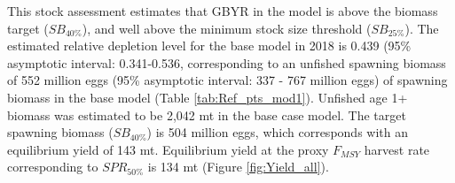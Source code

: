 \documentclass[12pt,]{article}
\begin{document}
This stock assessment estimates that GBYR in the model is above the
biomass target (\(SB_{40\%}\)), and well above the minimum stock size
threshold (\(SB_{25\%}\)). The estimated relative depletion level for
the base model in 2018 is 0.439 (95\% asymptotic interval: 0.341-0.536,
corresponding to an unfished spawning biomass of 552 million eggs (95\%
asymptotic interval: 337 - 767 million eggs) of spawning biomass in the
base model (Table \ref{tab:Ref_pts_mod1}). Unfished age 1+ biomass was
estimated to be 2,042 mt in the base case model. The target spawning
biomass (\(SB_{40\%}\)) is 504 million eggs, which corresponds with an
equilibrium yield of 143 mt. Equilibrium yield at the proxy \(F_{MSY}\)
harvest rate corresponding to \(SPR_{50\%}\) is 134 mt (Figure
\ref{fig:Yield_all}).

\FloatBarrier
\end{document}
